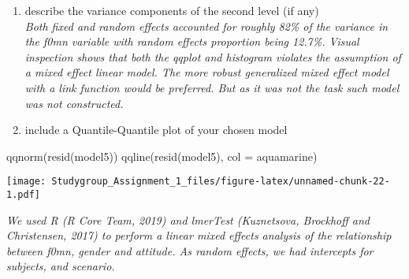\documentclass[
]{article}
\newenvironment{Shaded}{\begin{snugshade}}{\end{snugshade}}
\newcommand{\AttributeTok}[1]{\textcolor[rgb]{0.77,0.63,0.00}{#1}}
\newcommand{\FunctionTok}[1]{\textcolor[rgb]{0.00,0.00,0.00}{#1}}
\newcommand{\NormalTok}[1]{#1}
\newcommand{\StringTok}[1]{\textcolor[rgb]{0.31,0.60,0.02}{#1}}
\begin{document}
\begin{enumerate}
\def\labelenumi{\roman{enumi}.}
\setcounter{enumi}{3}
\item
  describe the variance components of the second level (if any)\\
  \emph{Both fixed and random effects accounted for roughly 82\% of the
  variance in the f0mn variable with random effects proportion being
  12.7\%. Visual inspection shows that both the qqplot and histogram
  violates the assumption of a mixed effect linear model. The more
  robust generalized mixed effect model with a link function would be
  preferred. But as it was not the task such model was not constructed.}
\item
  include a Quantile-Quantile plot of your chosen model
\end{enumerate}

\begin{Shaded}
\begin{Highlighting}[]
\FunctionTok{qqnorm}\NormalTok{(}\FunctionTok{resid}\NormalTok{(model5))}
\FunctionTok{qqline}\NormalTok{(}\FunctionTok{resid}\NormalTok{(model5), }\AttributeTok{col =} \StringTok{\textquotesingle{}aquamarine\textquotesingle{}}\NormalTok{)}
\end{Highlighting}
\end{Shaded}

\texttt{[image: Studygroup\_Assignment\_1\_files/figure-latex/unnamed-chunk-22-1.pdf]}

\emph{We used R (R Core Team, 2019) and lmerTest (Kuznetsova, Brockhoff
and Christensen, 2017) to perform a linear mixed effects analysis of the
relationship between f0mn, gender and attitude. As random effects, we
had intercepts for subjects, and scenario.}
\end{document}
